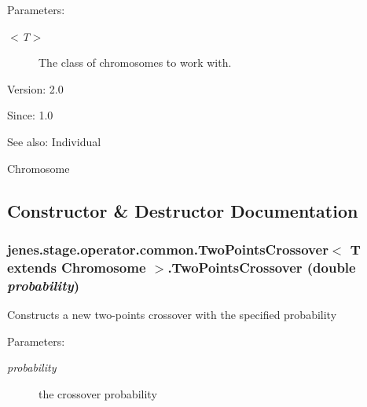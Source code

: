\begin{Desc}
\item[Parameters:]
\begin{description}
\item[{\em $<$T$>$}]The class of chromosomes to work with.\end{description}
\end{Desc}
\begin{Desc}
\item[Version:]2.0 \end{Desc}
\begin{Desc}
\item[Since:]1.0\end{Desc}
\begin{Desc}
\item[See also:]Individual 

Chromosome \end{Desc}


\subsection{Constructor \& Destructor Documentation}
\hypertarget{classjenes_1_1stage_1_1operator_1_1common_1_1_two_points_crossover_3_01_t_01extends_01_chromosome_01_4_b7fe58d08e9e9b89881661c16e80f19e}{
\subsubsection[TwoPointsCrossover]{\setlength{\rightskip}{0pt plus 5cm}jenes.stage.operator.common.TwoPointsCrossover$<$ T extends Chromosome $>$.TwoPointsCrossover (double {\em probability})}}
\label{classjenes_1_1stage_1_1operator_1_1common_1_1_two_points_crossover_3_01_t_01extends_01_chromosome_01_4_b7fe58d08e9e9b89881661c16e80f19e}


Constructs a new two-points crossover with the specified probability

\begin{Desc}
\item[Parameters:]
\begin{description}
\item[{\em probability}]the crossover probability \end{description}
\end{Desc}


